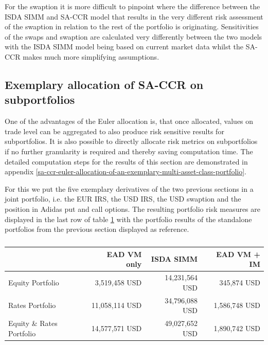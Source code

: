 \documentclass[../Thesis_AHoecherl.tex]{subfiles}
\begin{document}
    For the swaption it is more difficult to pinpoint where the difference between the \gls{ISDA SIMM} and \gls{SA-CCR} model that results in the very different risk assessment of the swaption in relation to the rest of the portfolio is originating.
    Sensitivities of the swaps and swaption are calculated very differently between the two models with the \gls{ISDA SIMM} model being based on current market data whilst the SA-CCR makes much more simplifying assumptions.

    \subsection{Exemplary allocation of SA-CCR on subportfolios\label{sec:Exemplary allocation of SA-CCR on subportfolios}}

    One of the advantages of the Euler allocation is, that once allocated, values on trade level can be aggregated to also produce risk sensitive results for subportfolios. It is also possible to directly allocate risk metrics on subportfolios if no further granularity is required and thereby saving computation time. The detailed computation steps for the results of this section are demonstrated in appendix \ref{sa-ccr-euler-allocation-of-an-exemplary-multi-asset-class-portfolio}.

    For this we put the five exemplary derivatives of the two previous sections in a joint portfolio, i.e. the EUR IRS, the USD IRS, the USD swaption and the position in Adidas put and call options.
    The resulting portfolio risk measures are displayed in the last row of table \ref{tab:multiAssetResult} with the portfolio results of the standalone portfolios from the previous section displayed as reference.

    \begin{table}[htbp]
        \centering
        \begin{tabular}{l||r|r|r}
                & EAD VM only &\gls{ISDA SIMM} & \gls{EAD} \gls{VM} + \gls{IM} \\
                \toprule
        Equity Portfolio & 3,519,458 USD & 14,231,564 USD & 345,874 USD \\
        Rates Portfolio & 11,058,114 USD & 34,796,088 USD & 1,586,748 USD \\
        \midrule
        Equity \& Rates Portfolio & 14,577,571 USD & 49,027,652  USD & 1,890,742 USD \\
        \end{tabular}%
        \caption{}
        \label{tab:multiAssetResult}%
    \end{table}%
\end{document}
